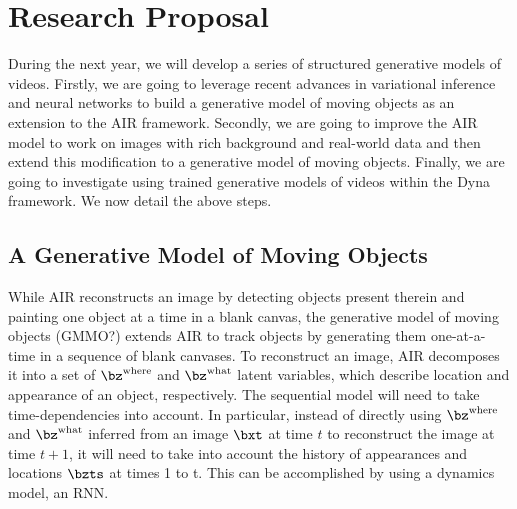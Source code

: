 \section{Research Proposal}
\label{sec:proposal}


    During the next year, we will develop a series of structured generative models of videos.
    Firstly, we are going to leverage recent advances in variational inference and neural networks to build a generative model of moving objects as an extension to the AIR framework. 
    Secondly, we are going to improve the AIR model to work on images with rich background and real-world data and then extend this modification to a generative model of moving objects. 
    Finally, we are going to investigate using trained generative models of videos within the Dyna framework.
    We now detail the above steps.
    
    \subsection{A Generative Model of Moving Objects}
        While AIR reconstructs an image by detecting objects present therein and painting one object at a time in a blank canvas, the generative model of moving objects (GMMO?) extends AIR to track objects by generating them one-at-a-time in a sequence of blank canvases.
        To reconstruct an image, AIR decomposes it into a set of $\bz^{\mathrm{where}}$ and $\bz^{\mathrm{what}}$ latent variables, which describe location and appearance of an object, respectively.
        The sequential model will need to take time-dependencies into account.
        In particular, instead of directly using $\bz^{\mathrm{where}}$ and $\bz^{\mathrm{what}}$ inferred from an image $\bxt$ at time $t$ to reconstruct the image at time $t+1$, it will need to take into account the history of appearances and locations $\bzts$ at times 1 to t.
        This can be accomplished by using a dynamics model, \eg an RNN. 
        

